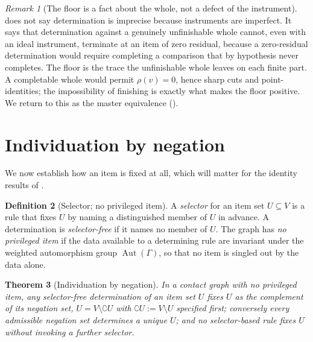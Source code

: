 \documentclass[11pt,twocolumn,a4paper]{article}
\theoremstyle{dirthm}
\newtheorem{theorem}{Theorem}[section]
\theoremstyle{definition}
\newtheorem{definition}[theorem]{Definition}
\theoremstyle{remark}
\newtheorem{remark}[theorem]{Remark}
\newcommand{\Gph}{\Gamma}
\newcommand{\V}{V}
\newcommand{\co}{\complement}
\newcommand{\res}{\rho}
\DeclareMathOperator{\Aut}{Aut}
\begin{document}
\begin{remark}[The floor is a fact about the whole, not a defect of the
instrument]
\label{rem:floor-fact}
 does not say determination is imprecise because instruments
are imperfect. It says that determination against a genuinely unfinishable
whole cannot, even with an ideal instrument, terminate at an item of zero
residual, because a zero-residual determination would require completing a
comparison that by hypothesis never completes. The floor is the trace the
unfinishable whole leaves on each finite part. A completable whole would
permit $\res(v)=0$, hence sharp cuts and point-identities; the impossibility
of finishing is exactly what makes the floor positive. We return to this as
the master equivalence ().
\end{remark}




\section{Individuation by negation}
\label{sec:negation}

We now establish how an item is fixed at all, which will matter for the
identity results of .

\begin{definition}[Selector; no privileged item]
\label{def:selector}
A \emph{selector} for an item set $U\subseteq\V$ is a rule that fixes $U$ by
naming a distinguished member of $U$ in advance. A determination is
\emph{selector-free} if it names no member of $U$. The graph has \emph{no
privileged item} if the data available to a determining rule are invariant
under the weighted automorphism group $\Aut(\Gph)$, so that no item is
singled out by the data alone.
\end{definition}

\begin{theorem}[Individuation by negation]
\label{thm:negation}
In a contact graph with no privileged item, any selector-free determination
of an item set $U$ fixes $U$ as the complement of its negation set,
$U=\V\setminus\co U$ with $\co U:=\V\setminus U$ specified first; conversely
every admissible negation set determines a unique $U$; and no selector-based
rule fixes $U$ without invoking a further selector.
\end{theorem}
\end{document}
